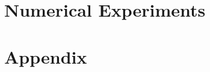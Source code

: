 \documentclass[]{article}
\theoremstyle{definition}
\numberwithin{equation}{subsection}
\begin{document}

            

\section{Numerical Experiments}\label{sec:numerics}
    
\appendix

\section{Appendix} 
    





\end{document}
